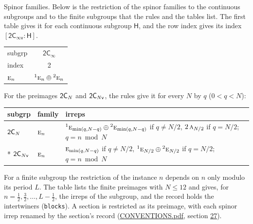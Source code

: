 \documentclass[10pt,a4paper]{article}
\makeatletter
\renewcommand\paragraph{\@startsection{paragraph}{4}{\z@}{1.5ex plus .5ex minus .2ex}{-1em}%
  {\normalfont\small\sffamily\bfseries\color{parttitle}}}
\numberwithin{equation}{section}
\newcommand{\grp}[1]{\mathsf{#1}}
\newcommand{\irr}[1]{\text{\normalfont\scshape #1}}
\newcommand{\conjpair}[1]{{}^{#1}}
\newcommand{\grpindex}[2]{[#1 : #2]}
\newcommand{\period}{L}
\makeatother
\begin{document}
\paragraph{Spinor families.} Below is the restriction of the spinor families to the continuous subgroups and to the finite subgroups that the rules and the tables list. The first table gives it for each continuous subgroup $\grp{H}$, and the row index gives its index $\grpindex{\grp{2C_{\infty v}}}{\grp{H}}$.
{\small\begin{longtable}{@{}lc@{}}\toprule
subgrp & \href{2Cinf.pdf}{$\grp{2C_{\infty }}$}\\
index & 2\\\midrule\endhead
\bottomrule\endfoot\endlastfoot
$\irr{e}_{n}$ & $\conjpair{1}\irr{e}_{n}\oplus \conjpair{2}\irr{e}_{n}$\\
\bottomrule\end{longtable}}
\leavevmode\label{n:index.residue}For the preimages $\grp{2C_{\mathnormal{N}}}$ and $\grp{2C_{\mathnormal{N}v}}$, the rules give it for every $N$ by $q$ ($0 < q < N$):
{\small\begin{longtable}{@{}ll>{\RaggedRight\arraybackslash}p{}@{}}\toprule
subgrp & family & irreps\\\midrule\endhead
\bottomrule\endfoot\endlastfoot
$\grp{2C_{\mathnormal{N}}}$ & $\irr{e}_{n}$ & $\conjpair{1}\irr{e}_{\min(q,N-q)}\oplus \conjpair{2}\irr{e}_{\min(q,N-q)}$ if $q \ne N/2$, $2\,\irr{a}_{N/2}$ if $q = N/2$; $q = n \bmod N$\\*
$\grp{2C_{\mathnormal{N}v}}$ & $\irr{e}_{n}$ & $\irr{e}_{\min(q,N-q)}$ if $q \ne N/2$, $\conjpair{1}\irr{e}_{N/2}\oplus \conjpair{2}\irr{e}_{N/2}$ if $q = N/2$; $q = n \bmod N$\\
\bottomrule\end{longtable}}
\leavevmode\label{n:index.period}For a finite subgroup the restriction of the instance $n$ depends on $n$ only modulo its period $\period$. The table lists the finite preimages with $N \le 12$ and gives, for $n = \tfrac{1}{2}, \tfrac{3}{2}, \dots, \period - \tfrac{1}{2}$, the irreps of the subgroup, and the record holds the intertwiners (\texttt{blocks}). A section is restricted as its preimage, with each spinor irrep renamed by the section's record (\href{../../CONVENTIONS.pdf}{CONVENTIONS.pdf}, section \href{../../CONVENTIONS.pdf\#conv.27}{27}).
\end{document}
